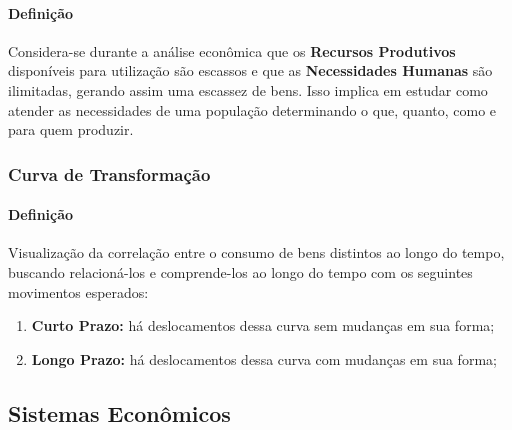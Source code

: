 \documentclass{article}
\begin{document}
                \paragraph{Definição}Considera-se durante a análise econômica que os \textbf{Recursos Produtivos} disponíveis para utilização são escassos e que as \textbf{Necessidades Humanas} são ilimitadas, gerando assim uma escassez de bens. Isso implica em estudar como atender as necessidades de uma população determinando o que, quanto, como e para quem produzir.

            \subsubsection{Curva de Transformação}
                \paragraph{Definição}Visualização da correlação entre o consumo de bens distintos ao longo do tempo, buscando relacioná-los e comprende-los ao longo do tempo com os seguintes movimentos esperados:
                    \begin{enumerate}[noitemsep]
                        \item \textbf{Curto Prazo:} há deslocamentos dessa curva sem mudanças em sua forma;
                        \item \textbf{Longo Prazo:} há deslocamentos dessa curva com mudanças em sua forma;
                    \end{enumerate}

        \subsection{Sistemas Econômicos}
\end{document}
